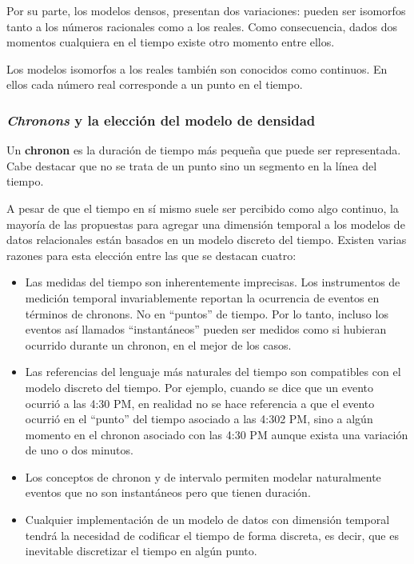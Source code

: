 \documentclass[11pt]{article}
\begin{document}
Por su parte, los modelos densos, presentan dos variaciones: pueden ser isomorfos tanto a los números racionales como a los reales. Como consecuencia, dados dos momentos cualquiera en el tiempo existe otro momento entre ellos.

Los modelos isomorfos a los reales también son conocidos como continuos. En ellos cada número real corresponde a un punto en el tiempo. 

















\subsubsection{\textit{Chronons} y la elección del modelo de densidad}
Un \textbf{chronon} es la duración de tiempo más pequeña que puede ser representada. Cabe destacar que no se trata de un punto sino un segmento en la línea del tiempo.

A pesar de que el tiempo en sí mismo suele ser percibido como algo continuo, la mayoría de las propuestas para agregar una dimensión temporal a los modelos de datos relacionales están basados en un modelo discreto del tiempo. Existen varias razones para esta elección entre las que se destacan cuatro:

\begin{itemize}
    \item Las medidas del tiempo son inherentemente imprecisas. Los instrumentos de medición temporal invariablemente reportan la ocurrencia de eventos en términos de chronons. No en “puntos” de tiempo. Por lo tanto, incluso los eventos así llamados “instantáneos” pueden ser medidos como si hubieran ocurrido durante un chronon, en el mejor de los casos.
    \item Las referencias del lenguaje más naturales del tiempo son compatibles con el modelo discreto del tiempo. Por ejemplo, cuando se dice que un evento ocurrió a las 4:30 PM, en realidad no se hace referencia a que el evento ocurrió en el “punto” del tiempo asociado a las 4:302 PM, sino a algún momento en el chronon asociado con las 4:30 PM aunque exista una variación de uno o dos minutos.
    \item Los conceptos de chronon y de intervalo permiten modelar naturalmente eventos que no son instantáneos pero que tienen duración.
    \item Cualquier implementación de un modelo de datos con dimensión temporal tendrá la necesidad de codificar el tiempo de forma discreta, es decir, que es inevitable discretizar el tiempo en algún punto.
    
\end{itemize}
\end{document}
